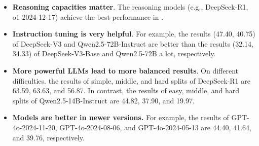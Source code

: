 \begin{itemize}
 \item  \textbf{Reasoning capacities matter}. The reasoning models (e.g., DeepSeek-R1, o1-2024-12-17) achieve the best performance in \textbf{\benchmark}. 
    \item  \textbf{Instruction tuning is very helpful}. 
    For example,
    the results (47.40, 40.75) of DeepSeek-V3 and Qwen2.5-72B-Instruct are better than the results (32.14, 34.33) of DeepSeek-V3-Base and Qwen2.5-72B a lot, respectively.
    \item \textbf{More powerful LLMs lead to more balanced results}.
    On different difficulties. the results of simple, middle, and hard splits of DeepSeek-R1 are 63.59, 63.63, and 56.87. In contrast, the results of easy, middle, and hard splits of Qwen2.5-14B-Instruct are 44.82, 37.90, and 19.97.

    \item \textbf{Models are better in newer versions.}
    For example,  the results of GPT-4o-2024-11-20,  GPT-4o-2024-08-06, and GPT-4o-2024-05-13 are 44.40, 41.64, and 39.76, respectively. 
\end{itemize}
